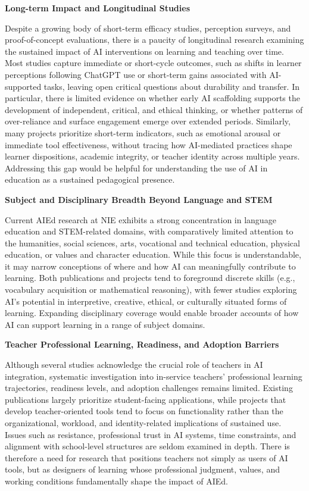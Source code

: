 \documentclass[english]{textolivre}
\begin{document}
\textbf{Long-term Impact and Longitudinal Studies}

    Despite a growing body of short-term efficacy studies, perception surveys, and proof-of-concept evaluations, there is a paucity of longitudinal research examining the sustained impact of AI interventions on learning and teaching over time. Most studies capture immediate or short-cycle outcomes, such as shifts in learner perceptions following ChatGPT use or short-term gains associated with AI-supported tasks, leaving open critical questions about durability and transfer. In particular, there is limited evidence on whether early AI scaffolding supports the development of independent, critical, and ethical thinking, or whether patterns of over-reliance and surface engagement emerge over extended periods. Similarly, many projects prioritize short-term indicators, such as emotional arousal or immediate tool effectiveness, without tracing how AI-mediated practices shape learner dispositions, academic integrity, or teacher identity across multiple years. Addressing this gap would be helpful for understanding the use of AI in education as a sustained pedagogical presence.

\textbf{Subject and Disciplinary Breadth Beyond Language and STEM}

    Current AIEd research at NIE exhibits a strong concentration in language education and STEM-related domains, with comparatively limited attention to the humanities, social sciences, arts, vocational and technical education, physical education, or values and character education. While this focus is understandable, it may narrow conceptions of where and how AI can meaningfully contribute to learning. Both publications and projects tend to foreground discrete skills (e.g., vocabulary acquisition or mathematical reasoning), with fewer studies exploring AI’s potential in interpretive, creative, ethical, or culturally situated forms of learning. Expanding disciplinary coverage would enable broader accounts of how AI can support learning in a range of subject domains.

\textbf{Teacher Professional Learning, Readiness, and Adoption Barriers}

    Although several studies acknowledge the crucial role of teachers in AI integration, systematic investigation into in-service teachers’ professional learning trajectories, readiness levels, and adoption challenges remains limited. Existing publications largely prioritize student-facing applications, while projects that develop teacher-oriented tools tend to focus on functionality rather than the organizational, workload, and identity-related implications of sustained use. Issues such as resistance, professional trust in AI systems, time constraints, and alignment with school-level structures are seldom examined in depth. There is therefore a need for research that positions teachers not simply as users of AI tools, but as designers of learning whose professional judgment, values, and working conditions fundamentally shape the impact of AIEd.
\end{document}
